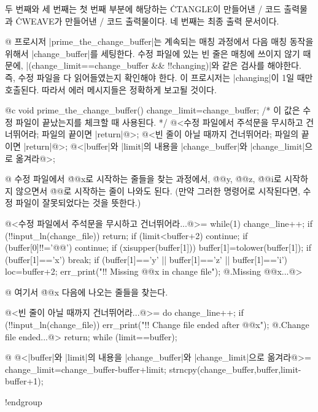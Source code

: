 {%
두 번째와 세 번째는 첫 번째 부분에 해당하는 \.{CTANGLE}이 만들어낸 \CEE/ 코드 출력물과
\.{CWEAVE}가 만들어낸 \TEX/ 코드 출력물이다. 네 번째는 최종 출력 문서이다.

\vskip 10pt
\eightpoint
\verbatim
@ 프로시저 |prime_the_change_buffer|는 계속되는 매칭 과정에서 다음 매칭 동작을 위해서 |change_buffer|를
세팅한다. 수정 파일에 있는 빈 줄은 매칭에 쓰이지 않기 때문에, |(change_limit==change_buffer && !!changing)|와
같은 검사를 해야한다. 즉, 수정 파일을 다 읽어들였는지 확인해야 한다. 이 프로시저는 |changing|이 1일 때만
호출된다. 따라서 에러 메시지들은 정확하게 보고될 것이다.

@c
void
prime_the_change_buffer()
{
  change_limit=change_buffer; /* 이 값은 수정 파일이 끝났는지를 체크할 때 사용된다. */
  @<수정 파일에서 주석문을 무시하고 건너뛰어라; 파일의 끝이면 |return|@>;
  @<빈 줄이 아닐 때까지 건너뛰어라; 파일의 끝이면 |return|@>;
  @<|buffer|와 |limit|의 내용을 |change_buffer|와 |change_limit|으로 옮겨라@>;
}

@ 수정 파일에서 \.{@@x}로 시작하는 줄들을 찾는 과정에서, \.{@@y},
\.{@@z}, \.{@@i}로 시작하지 않으면서 \.{@@}로 시작하는 줄이 나와도 된다.
(만약 그러한 명령어로 시작된다면, 수정 파일이 잘못되었다는 것을 뜻한다.)

@<수정 파일에서 주석문을 무시하고 건너뛰어라...@>=
while(1) {
  change_line++;
  if (!!input_ln(change_file)) return;
  if (limit<buffer+2) continue;
  if (buffer[0]!!='@@') continue;
  if (xisupper(buffer[1])) buffer[1]=tolower(buffer[1]);
  if (buffer[1]=='x') break;
  if (buffer[1]=='y' || buffer[1]=='z' || buffer[1]=='i') {
    loc=buffer+2;
    err_print("!! Missing @@x in change file");
@.Missing @@x...@>
  }
}

@ 여기서 \.{@@x} 다음에 나오는 줄들을 찾는다.

@<빈 줄이 아닐 때까지 건너뛰어라...@>=
do {
  change_line++;
  if (!!input_ln(change_file)) {
    err_print("!! Change file ended after @@x");
@.Change file ended...@>
    return;
  }
} while (limit==buffer);

@ @<|buffer|와 |limit|의 내용을 |change_buffer|와 |change_limit|으로 옮겨라@>=
{
  change_limit=change_buffer-buffer+limit;
  strncpy(change_buffer,buffer,limit-buffer+1);
}

!endgroup
\vfill\eject

}
